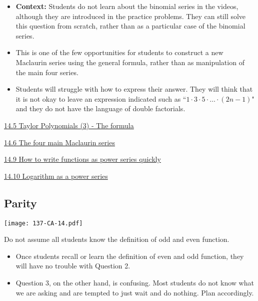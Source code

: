 \documentclass[11pt]{article}
\newcommand{\nl}{\hfill \vspace{-1.1\baselineskip}} %
\newcommand{\vv}{\hspace{8mm}  \href{https://www.youtube.com/watch?v=c-rI1zMj0wA&list=PLlwePzQY_wW9h32ZwS6CYsY4eR_b2pE9j&index=5}{14.5 Taylor Polynomials (3) - The formula}}
\newcommand{\vvi}{\hspace{8mm}  \href{https://www.youtube.com/watch?v=o-RSENE_Yus&list=PLlwePzQY_wW9h32ZwS6CYsY4eR_b2pE9j&index=6}{14.6 The four main Maclaurin series}}
\newcommand{\vix}{\hspace{8mm}  \href{https://www.youtube.com/watch?v=ksKu5p2qvB4&list=PLlwePzQY_wW9h32ZwS6CYsY4eR_b2pE9j&index=9}{14.9 How to write functions as power series quickly}}
\newcommand{\vx}{\hspace{8mm}  \href{https://www.youtube.com/watch?v=NYVjEbpY21w&list=PLlwePzQY_wW9h32ZwS6CYsY4eR_b2pE9j&index=10}{14.10 Logarithm as a power series}}
\begin{document}
\begin{comments}
\nl
	\begin{itemize}
		\item {\bf Context:}  Students do not learn about the binomial series in the videos, although they are introduced in the practice problems.  They can still solve this question from scratch, rather than as a particular case of the binomial series.

		\item This is one of the few opportunities for students to construct a new Maclaurin series using the general formula, rather than as manipulation of the main four series. 
		
		\item Students will struggle with how to express their answer.  They will think that it is not okay to leave an expression indicated such as ``$1 \cdot 3 \cdot 5 \cdot \ldots \cdot (2n-1)$" and they do not have the language of double factorials.
		
	\end{itemize}
\end{comments}

\begin{videos}
\vv

\vvi

\vix

\vx
\end{videos}

\newpage
\subsection{Parity}

\begin{center}
{ \texttt{[image: 137-CA-14.pdf]}} 
\end{center}

\begin{warning}
	Do not assume all students know the definition of odd and even function.
\end{warning}

\begin{comments}
\nl
	\begin{itemize}
		\item Once students recall or learn the definition of even and odd function, they will have no trouble with Question 2.
		
		\item Question 3, on the other hand, is confusing.  Most students do not know what we are asking and are tempted to just wait and do nothing.  Plan accordingly.
	\end{itemize}
\end{comments}
\end{document}
